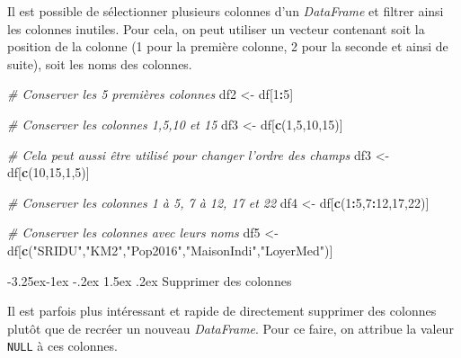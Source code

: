 \documentclass[
  11pt,
  french,
]{book}
\makeatletter
\newenvironment{Shaded}{\begin{snugshade}}{\end{snugshade}}
\newcommand{\CommentTok}[1]{\textcolor[rgb]{0.56,0.35,0.01}{\textit{#1}}}
\newcommand{\DecValTok}[1]{\textcolor[rgb]{0.00,0.00,0.81}{#1}}
\newcommand{\KeywordTok}[1]{\textcolor[rgb]{0.13,0.29,0.53}{\textbf{#1}}}
\newcommand{\NormalTok}[1]{#1}
\newcommand{\OperatorTok}[1]{\textcolor[rgb]{0.81,0.36,0.00}{\textbf{#1}}}
\newcommand{\StringTok}[1]{\textcolor[rgb]{0.31,0.60,0.02}{#1}}
\newenvironment{kframe}{%
\medskip{}
\setlength{\fboxsep}{.8em}
 \def\at@end@of@kframe{}%
 \ifinner\ifhmode%
  \def\at@end@of@kframe{\end{minipage}}%
  \begin{minipage}{\columnwidth}%
 \fi\fi%
 \def\FrameCommand##1{\hskip\@totalleftmargin \hskip-\fboxsep
 \colorbox{shadecolor}{##1}\hskip-\fboxsep
     \hskip-\linewidth \hskip-\@totalleftmargin \hskip\columnwidth}%
 \MakeFramed {\advance\hsize-\width
   \@totalleftmargin\z@ \linewidth\hsize
   \@setminipage}}%
 {\par\unskip\endMakeFramed%
 \at@end@of@kframe}
\renewenvironment{Shaded}{\begin{kframe}}{\end{kframe}}
\renewcommand\paragraph{\@startsection{paragraph}{4}{\z@}%
   {-3.25ex\@plus -1ex \@minus -.2ex}%
   {1.5ex \@plus .2ex}%
   {\normalfont\normalsize\bfseries}}
\makeatother
\begin{document}
Il est possible de sélectionner plusieurs colonnes d'un \emph{DataFrame} et filtrer ainsi les colonnes inutiles. Pour cela, on peut utiliser un vecteur contenant soit la position de la colonne (1 pour la première colonne, 2 pour la seconde et ainsi de suite), soit les noms des colonnes.

\begin{Shaded}
\begin{Highlighting}[]
\CommentTok{# Conserver les 5 premières colonnes}
\NormalTok{df2 <-}\StringTok{ }\NormalTok{df[}\DecValTok{1}\OperatorTok{:}\DecValTok{5}\NormalTok{]}

\CommentTok{# Conserver les colonnes 1,5,10 et 15}
\NormalTok{df3 <-}\StringTok{ }\NormalTok{df[}\KeywordTok{c}\NormalTok{(}\DecValTok{1}\NormalTok{,}\DecValTok{5}\NormalTok{,}\DecValTok{10}\NormalTok{,}\DecValTok{15}\NormalTok{)]}

\CommentTok{# Cela peut aussi être utilisé pour changer l'ordre des champs}
\NormalTok{df3 <-}\StringTok{ }\NormalTok{df[}\KeywordTok{c}\NormalTok{(}\DecValTok{10}\NormalTok{,}\DecValTok{15}\NormalTok{,}\DecValTok{1}\NormalTok{,}\DecValTok{5}\NormalTok{)]}

\CommentTok{# Conserver les colonnes 1 à 5, 7 à 12, 17 et 22}
\NormalTok{df4 <-}\StringTok{ }\NormalTok{df[}\KeywordTok{c}\NormalTok{(}\DecValTok{1}\OperatorTok{:}\DecValTok{5}\NormalTok{,}\DecValTok{7}\OperatorTok{:}\DecValTok{12}\NormalTok{,}\DecValTok{17}\NormalTok{,}\DecValTok{22}\NormalTok{)]}

\CommentTok{# Conserver les colonnes avec leurs noms}
\NormalTok{df5 <-}\StringTok{ }\NormalTok{df[}\KeywordTok{c}\NormalTok{(}\StringTok{"SRIDU"}\NormalTok{,}\StringTok{"KM2"}\NormalTok{,}\StringTok{"Pop2016"}\NormalTok{,}\StringTok{"MaisonIndi"}\NormalTok{,}\StringTok{"LoyerMed"}\NormalTok{)]}
\end{Highlighting}
\end{Shaded}

\hypertarget{sect014223}{%
\paragraph{Supprimer des colonnes}\label{sect014223}}

Il est parfois plus intéressant et rapide de directement supprimer des colonnes plutôt que de recréer un nouveau \emph{DataFrame}. Pour ce faire, on attribue la valeur \texttt{NULL} à ces colonnes.
\end{document}
